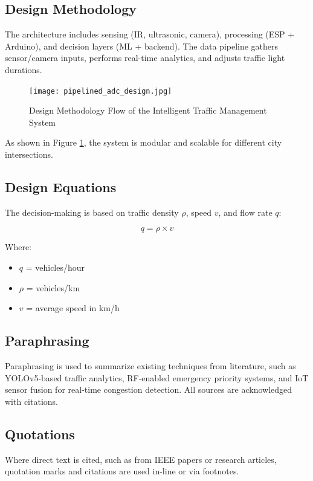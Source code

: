 \documentclass[12pt]{report}
\begin{document}
\subsection{Design Methodology}
The architecture includes sensing (IR, ultrasonic, camera), processing (ESP + Arduino), and decision layers (ML + backend). The data pipeline gathers sensor/camera inputs, performs real-time analytics, and adjusts traffic light durations.

\begin{figure}[htb]
\centering
\texttt{[image: pipelined\_adc\_design.jpg]}
\caption{Design Methodology Flow of the Intelligent Traffic Management System}
\label{fig:design_flow}
\end{figure}

As shown in Figure \ref{fig:design_flow}, the system is modular and scalable for different city intersections.

\subsection{Design Equations}

The decision-making is based on traffic density $\rho$, speed $v$, and flow rate $q$:

\begin{equation}
q = \rho \times v
\end{equation}

Where:
\begin{itemize}
\item $q$ = vehicles/hour
\item $\rho$ = vehicles/km
\item $v$ = average speed in km/h
\end{itemize}

\subsection{Paraphrasing}
Paraphrasing is used to summarize existing techniques from literature, such as YOLOv5-based traffic analytics, RF-enabled emergency priority systems, and IoT sensor fusion for real-time congestion detection. All sources are acknowledged with citations.

\subsection{Quotations}
Where direct text is cited, such as from IEEE papers or research articles, quotation marks and citations are used in-line or via footnotes.
\end{document}
